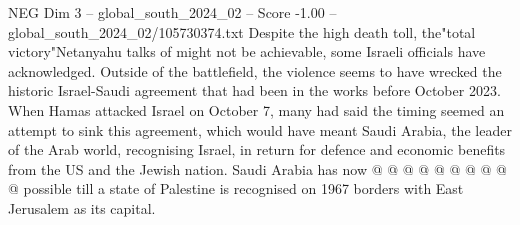 \begin{textsample}{NEG Dim 3 – global\_south\_2024\_02 – Score -1.00 – global\_south\_2024\_02/105730374.txt}
Despite the high death toll, the"total victory"Netanyahu talks of might not be achievable, some Israeli officials have acknowledged.
Outside of the battlefield, the violence seems to have wrecked the historic Israel-Saudi agreement that had been in the works before October 2023.
When Hamas attacked Israel on October 7, many had said the timing seemed an attempt to sink this agreement, which would have meant Saudi Arabia, the leader of the Arab world, recognising Israel, in return for defence and economic benefits from the US and the Jewish nation.
Saudi Arabia has now @ @ @ @ @ @ @ @ @ @ possible till a state of Palestine is recognised on 1967 borders with East Jerusalem as its capital.

\end{textsample}
